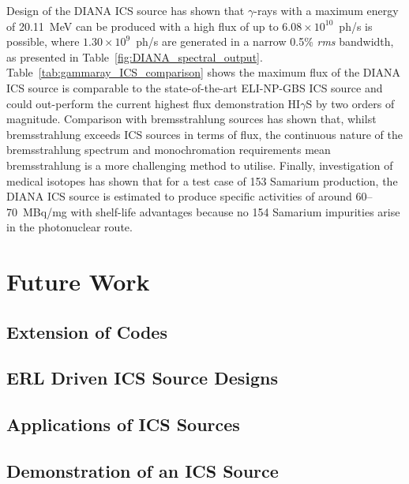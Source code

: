 \documentclass[../main.tex]{subfiles}
\begin{document}
Design of the DIANA ICS source has shown that $\gamma$-rays with a maximum energy of 20.11~\si{\mega\electronvolt} can be produced with a high flux of up to $6.08\times 10^{10}$~ph/\si{\second} is possible, where $1.30\times 10^{9}$~ph/\si{\second} are generated in a narrow 0.5\% \textit{rms} bandwidth, as presented in Table~\ref{fig:DIANA_spectral_output}. Table~\ref{tab:gammaray_ICS_comparison} shows the maximum flux of the DIANA ICS source is comparable to the state-of-the-art ELI-NP-GBS \cite{elinp2019vega,tanaka2020current} ICS source and could out-perform the current highest flux demonstration HI$\gamma$S \cite{weller2009research} by two orders of magnitude. Comparison with bremsstrahlung sources has shown that, whilst bremsstrahlung exceeds ICS sources in terms of flux, the continuous nature of the bremsstrahlung spectrum and monochromation requirements mean bremsstrahlung is a more challenging method to utilise. Finally, investigation of medical isotopes has shown that for a test case of 153 Samarium production, the DIANA ICS source is estimated to produce specific activities of around 60--70~\si{\mega\becquerel}/\si{\milli\gram} with shelf-life advantages because no 154 Samarium impurities arise in the photonuclear route. 

\section{Future Work}

\subsection{Extension of Codes}

\subsection{ERL Driven ICS Source Designs}

\subsection{Applications of ICS Sources}

\subsection{Demonstration of an ICS Source}
\end{document}
